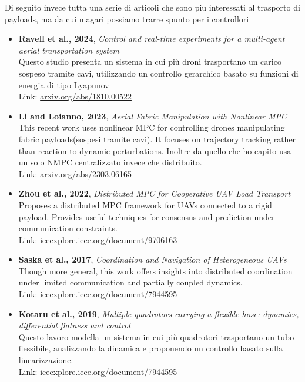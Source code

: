 \documentclass[11pt]{article}
\begin{document}
   Di seguito invece tutta una serie di articoli che sono piu interessati al trasporto di payloads, ma da cui magari possiamo trarre spunto per i controllori
  \begin{itemize}
     \item \textbf{Ravell et al., 2024}, \emph{Control and real-time experiments for a multi-agent aerial transportation system} \\
   Questo studio presenta un sistema in cui più droni trasportano un carico sospeso tramite cavi, utilizzando un controllo gerarchico basato su funzioni di energia di tipo Lyapunov \\
    Link: \href{https://link.springer.com/article/10.1007/s40430-024-05166-5?utm_source=chatgpt.com}{arxiv.org/abs/1810.00522}
       
    \item \textbf{Li and Loianno, 2023}, \emph{Aerial Fabric Manipulation with Nonlinear MPC} \\
    This recent work uses nonlinear MPC for controlling drones manipulating fabric payloads(sospesi tramite cavi). It focuses on trajectory tracking rather than reaction to dynamic perturbations. Inoltre da quello che ho capito usa un solo NMPC centralizzato invece che distribuito. \\
    Link: \href{https://arxiv.org/abs/2303.06165}{arxiv.org/abs/2303.06165}
    
    \item \textbf{Zhou et al., 2022}, \emph{Distributed MPC for Cooperative UAV Load Transport} \\
    Proposes a distributed MPC framework for UAVs connected to a rigid payload. Provides useful techniques for consensus and prediction under communication constraints. \\
    Link: \href{https://ieeexplore.ieee.org/document/9706163}{ieeexplore.ieee.org/document/9706163}
    
    \item \textbf{Saska et al., 2017}, \emph{Coordination and Navigation of Heterogeneous UAVs} \\
    Though more general, this work offers insights into distributed coordination under limited communication and partially coupled dynamics. \\
    Link: \href{https://ieeexplore.ieee.org/document/7944595}{ieeexplore.ieee.org/document/7944595}
    
     \item \textbf{Kotaru et al., 2019}, \emph{Multiple quadrotors carrying a flexible hose: dynamics, differential flatness and control} \\
    Questo lavoro modella un sistema in cui più quadrotori trasportano un tubo flessibile, analizzando la dinamica e proponendo un controllo basato sulla linearizzazione. \\
    Link: \href{https://arxiv.org/abs/1911.12650?utm_source=chatgpt.com}{ieeexplore.ieee.org/document/7944595}
    

\end{itemize}
\end{document}
